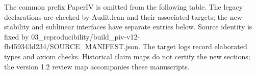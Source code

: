\documentclass[english,11pt,a4paper]{article}
\begin{document}
The common prefix {\ttfamily\small PaperIV} is omitted from the following table. The legacy declarations are checked by {\ttfamily\small Audit.\discretionary{\hbox{\ensuremath{\hookrightarrow}}}{}{}lean} and their associated targets; the new stability and sublinear interfaces have separate entries below. Source identity is fixed by {\ttfamily\small 03\_\discretionary{\hbox{\ensuremath{\hookrightarrow}}}{}{}reproducibil\discretionary{\hbox{\ensuremath{\hookrightarrow}}}{}{}ity/\discretionary{\hbox{\ensuremath{\hookrightarrow}}}{}{}build\_\discretionary{\hbox{\ensuremath{\hookrightarrow}}}{}{}piv-\discretionary{\hbox{\ensuremath{\hookrightarrow}}}{}{}v12-\discretionary{\hbox{\ensuremath{\hookrightarrow}}}{}{}fb459343d234\discretionary{\hbox{\ensuremath{\hookrightarrow}}}{}{}/\discretionary{\hbox{\ensuremath{\hookrightarrow}}}{}{}SOURCE\_\discretionary{\hbox{\ensuremath{\hookrightarrow}}}{}{}MANIFEST.\discretionary{\hbox{\ensuremath{\hookrightarrow}}}{}{}json}. The target logs record elaborated types and axiom checks. Historical claim maps do not certify the new sections; the version 1.2 review map accompanies these manuscripts.
\end{document}
